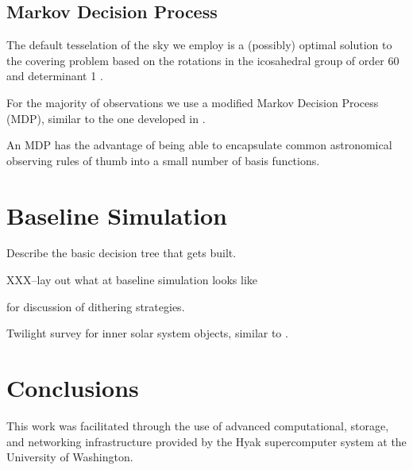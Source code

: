 \documentclass[]{aastex631}
\begin{document}
\subsection{Markov Decision Process}

The default tesselation of the sky we employ is a (possibly) optimal solution to the covering problem based on the rotations in the icosahedral group of order 60 and determinant 1 \citep{Hardin94}.

For the majority of observations we use a modified Markov Decision Process (MDP), similar to the one developed in \citet{Naghib2019}.

An MDP has the advantage of being able to encapsulate common astronomical observing rules of thumb into a small number of basis functions. 


\begin{figure}
\end{figure}

\section{Baseline Simulation}

Describe the basic decision tree that gets built. 


XXX--lay out what at baseline simulation looks like


\citet{Awan2016} for discussion of dithering strategies. 

Twilight survey for inner solar system objects, similar to \citet{Ye2020}.


\section{Conclusions}


          
{}


\begin{acknowledgments}
This work was facilitated through the use of advanced computational, storage, and networking infrastructure provided by the Hyak supercomputer system at the University of Washington.
\end{acknowledgments}
\end{document}
